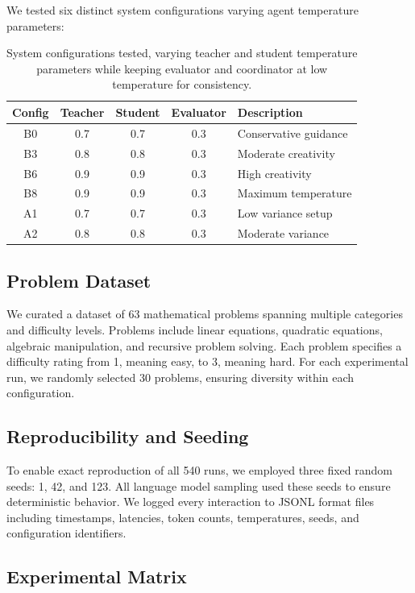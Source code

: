 \documentclass[conference]{IEEEtran}
\begin{document}
We tested six distinct system configurations varying agent temperature parameters:

\begin{table}[H]
\centering
\begin{tabular}{ccccl}
\toprule
\textbf{Config} & \textbf{Teacher} & \textbf{Student} & \textbf{Evaluator} & \textbf{Description} \\
\midrule
B0 & 0.7 & 0.7 & 0.3 & Conservative guidance \\
B3 & 0.8 & 0.8 & 0.3 & Moderate creativity \\
B6 & 0.9 & 0.9 & 0.3 & High creativity \\
B8 & 0.9 & 0.9 & 0.3 & Maximum temperature \\
A1 & 0.7 & 0.7 & 0.3 & Low variance setup \\
A2 & 0.8 & 0.8 & 0.3 & Moderate variance \\
\bottomrule
\end{tabular}
\caption{System configurations tested, varying teacher and student temperature parameters while keeping evaluator and coordinator at low temperature for consistency.}
\end{table}

\subsection{Problem Dataset}

We curated a dataset of 63 mathematical problems spanning multiple categories and difficulty levels. Problems include linear equations, quadratic equations, algebraic manipulation, and recursive problem solving. Each problem specifies a difficulty rating from 1, meaning easy, to 3, meaning hard. For each experimental run, we randomly selected 30 problems, ensuring diversity within each configuration.

\subsection{Reproducibility and Seeding}

To enable exact reproduction of all 540 runs, we employed three fixed random seeds: 1, 42, and 123. All language model sampling used these seeds to ensure deterministic behavior. We logged every interaction to JSONL format files including timestamps, latencies, token counts, temperatures, seeds, and configuration identifiers.

\subsection{Experimental Matrix}
\end{document}
